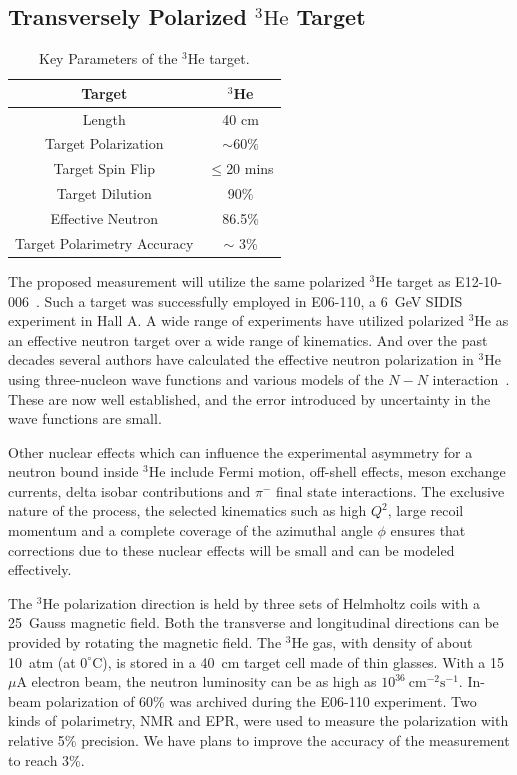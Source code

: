 \subsection {Transversely Polarized $\mathrm{^{3}He}$ Target}

\begin{table}[!ht]
\centering
\begin{tabular}{|c|c|}
\hline
Target                       & $^3$He              \\\hline 
Length                       & 40 cm               \\\hline          
Target Polarization          & $\sim$60\%          \\\hline 
Target Spin Flip             & $\leq$20 mins       \\\hline 
Target Dilution              & 90\%                \\\hline
Effective Neutron            & 86.5\%              \\\hline
Target Polarimetry Accuracy  & $\sim$ 3\%          \\\hline
\end{tabular}
\caption{\footnotesize{Key Parameters of the $\mathrm{^{3}He}$
    target.}\label{table:target}}
\end{table}

The proposed measurement will utilize the same polarized $\mathrm{^{3}He}$
target as E12-10-006~\cite{solid:e12-10-006}. Such a target was successfully
employed in E06-110, a 6~GeV SIDIS experiment in Hall A.  A wide range of
experiments have utilized polarized $^3$He as an effective neutron target over
a wide range of kinematics. And over the past decades several authors have
calculated the effective neutron polarization in $^3$He using three-nucleon
wave functions and various models of the $N-N$ interaction~\cite{3hepol1}.
These are now well established, and the error introduced by uncertainty in the
wave functions are small.

Other nuclear effects which can influence the experimental asymmetry for a
neutron bound inside $^3$He include Fermi motion, off-shell effects, meson
exchange currents, delta isobar contributions and $\pi^-$ final state
interactions. The exclusive nature of the process, the selected kinematics such
as high $Q^2$, large recoil momentum and a complete coverage of the azimuthal
angle $\phi$ ensures that corrections due to these nuclear effects will be
small and can be modeled effectively.

The $\mathrm{^{3}He}$ polarization direction is held by three sets of Helmholtz
coils with a 25~Gauss magnetic field. Both the transverse and longitudinal
directions can be provided by rotating the magnetic field. The
$\mathrm{^{3}He}$ gas, with density of about 10~atm (at $0^{\circ}$C), is stored
in a 40~cm target cell made of thin glasses. With a 15~$\mu$A electron beam,
the neutron luminosity can be as high as $\mathrm{10^{36}~cm^{-2}s^{-1}}$. In-beam
polarization of 60\% was archived during the E06-110 experiment. Two kinds of
polarimetry, NMR and EPR, were used to measure the polarization with relative
5\% precision. We have plans to improve the accuracy of the measurement to
reach 3\%.

